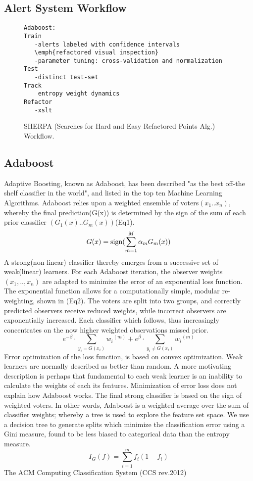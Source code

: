 \documentclass[12pt]{article}
\begin{document}
\subsection*{Alert System Workflow}
\begin{figure}[h!]
\begin{lstlisting}[frame=single]
Adaboost:
Train
   -alerts labeled with confidence intervals
   \emph{refactored visual inspection}
   -parameter tuning: cross-validation and normalization
Test
   -distinct test-set
Track
    entropy weight dynamics
Refactor
   -xslt
\end{lstlisting}
\caption{SHERPA (Searches for Hard and Easy Refactored Points Alg.) Workflow.\label{fig:workflow1}}
\end{figure}

\subsection*{Adaboost}
  Adaptive Boosting, known as Adaboost, has been described "as the best off-the shelf classifier in the world"\cite{elemStatLearn}, and listed in the top ten Machine Learning Algorithms.  Adaboost relies upon a weighted ensemble of voters$(x_1..x_n)$, whereby the final prediction(G(x)) is determined by the sign of the sum of each prior classifier $(G_1(x)..G_m(x))$(Eq1).
\begin{equation}
G(x)=\textup{sign}(\sum_{m=1}^{M}\alpha_{m}G_{m}(x) )
\end{equation}
A strong(non-linear) classifier thereby emerges from a successive set of weak(linear) learners.  For each Adaboost iteration, the observer weights$(x_1,..,x_n)$ are adapted to minimize the error of an exponential loss function.  The exponential function allows for a computationally simple, modular re-weighting, shown in (Eq2).  The voters are split into two groups, and correctly predicted observers receive reduced weights, while incorrect observers are exponentially increased.  Each classifier which follows, thus increasingly concentrates on the now higher weighted observations missed prior.
\begin{equation}
e^{-\beta }\cdot\sum_{y_{i}=G(x_{i})}{w_{i}}^{(m)} + e^{\beta }\cdot\sum_{y_{i}\neq G(x_{i})}{w_{i}}^{(m)}
\end{equation}
   Error optimization of the loss function, is based on convex optimization.  Weak learners are normally described as better than random.  A more motivating description is perhaps that fundamental to each weak learner is an inability to calculate the weights of each its features.  Minimization of error loss does not explain how Adaboost works.  The final strong classifier is based on the sign of weighted voters.  In other words, Adaboost is a weighted average over the sum of classifier weights; whereby a tree is used to explore the feature set space.  We use a decision tree to generate splits which minimize the classification error using a Gini measure, found to be less biased to categorical data than the entropy measure.
\begin{equation}
I_G(f)=\sum_{i=1}^{m}f_i(1-f_i)
\end{equation}
The ACM Computing Classification System (CCS rev.2012)
\end{document}
